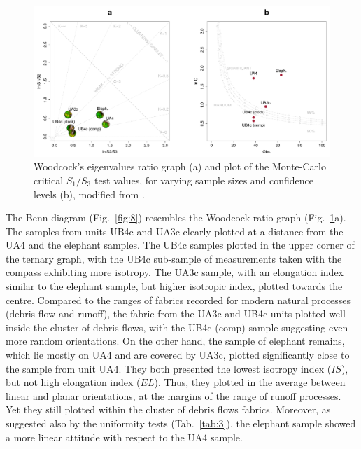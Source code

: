 \documentclass[preprint,authoryear,times]{elsarticle} %
\begin{document}
\begin{figure}[]
  \centering
  \includegraphics[width=1\textwidth]{../artwork/Fig7.pdf}
  \caption{Woodcock's eigenvalues ratio graph (a) and plot of the Monte-Carlo critical $S_1/S_3$ test values, for varying sample sizes and confidence levels (b), modified from \cite{Woodcock1983}.}
  \label{fig:7}
\end{figure}

The Benn diagram (Fig.~\ref{fig:8}) resembles the Woodcock ratio graph (Fig.~\ref{fig:7}a). The samples from units UB4c and UA3c clearly plotted at a distance from the UA4 and the elephant samples. The UB4c samples plotted in the upper corner of the ternary graph, with the UB4c sub-sample of measurements taken with the compass exhibiting more isotropy. The UA3c sample, with an elongation index similar to the elephant sample, but higher isotropic index, plotted towards the centre. Compared to the ranges of fabrics recorded for modern natural processes (debris flow and runoff), the fabric from the UA3c and UB4c units plotted well inside the cluster of debris flows, with the UB4c (comp) sample suggesting even more random orientations. On the other hand, the sample of elephant remains, which lie mostly on UA4 and are covered by UA3c, plotted significantly close to the sample from unit UA4. They both presented the lowest isotropy index ($IS$), but not high elongation index ($EL$). Thus, they plotted in the average between linear and planar orientations, at the margins of the range of runoff processes. Yet they still plotted within the cluster of debris flows fabrics. Moreover, as suggested also by the uniformity tests (Tab.~\ref{tab:3}), the elephant sample showed a more linear attitude with respect to the UA4 sample.
\end{document}
